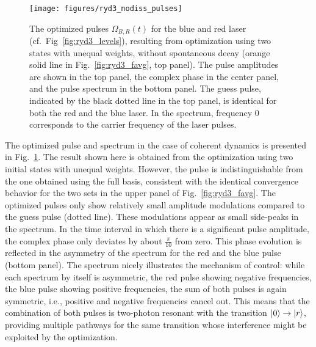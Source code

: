 \begin{figure}[tbp] %
  \centering
  \texttt{[image: figures/ryd3\_nodiss\_pulses]}
  \caption{The optimized pulses $\Omega_{B,R}(t)$ for the blue and red laser
           (cf.\ Fig~\ref{fig:ryd3_levels}), resulting from optimization using two
           states with unequal weights, without spontaneous decay (orange
           solid line in Fig.~\ref{fig:ryd3_favg}, top panel). The pulse
           amplitudes are shown in the top panel, the complex phase in the
           center panel, and the pulse spectrum in the bottom panel.  The guess
           pulse, indicated by the black dotted line in the top panel, is
           identical for both the red and the blue laser.  In the spectrum,
           frequency 0 corresponds to the carrier frequency of the laser pulses.
  }
  \label{fig:ryd3_nodiss_pulses}
\end{figure}
The optimized pulse and spectrum in the case of coherent dynamics is presented in
Fig.~\ref{fig:ryd3_nodiss_pulses}. The result shown here is obtained from the
optimization using two initial states with unequal weights. However, the pulse is
indistinguishable from the one obtained using the full basis, consistent with
the identical convergence behavior for the two sets in the upper panel of
Fig.~\ref{fig:ryd3_favg}. The optimized pulses only show relatively small
amplitude modulations compared to the guess pulse (dotted line). These
modulations appear as small side-peaks in the spectrum. In the time interval in
which there is a significant pulse amplitude, the complex phase only deviates by
about $\frac{\pi}{10}$ from zero. This phase evolution is
reflected in the asymmetry of the spectrum for the red and the blue pulse
(bottom panel). The spectrum nicely illustrates the
mechanism of control: while each spectrum by itself is asymmetric, the
red pulse showing negative frequencies, the blue pulse showing positive
frequencies, the sum of both pulses is again symmetric, i.e., positive and
negative frequencies cancel out. This means that the combination of both pulses
is two-photon resonant with the transition $\Ket{0} \rightarrow \Ket{r}$,
providing multiple pathways for the same transition whose interference might be
exploited by the optimization.

